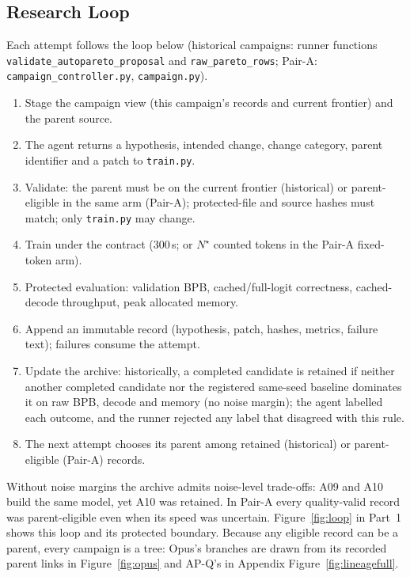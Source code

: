 \documentclass{article}
\newif\ifshowhumanmarkers \showhumanmarkersfalse
\newcommand{\humantag}[1]{{\color{humanframe}\sffamily\scriptsize\bfseries HUMAN AUTHOR MUST REWRITE/VERIFY [#1]}\ }
\newcommand{\humanauthor}[2][]{\ifshowhumanmarkers\begin{humanbox}\humantag{#1}#2\end{humanbox}\else #2\par\fi}
\begin{document}
\subsection{Research Loop}\label{sec:loop}
Each attempt follows the loop below (historical campaigns: runner functions \texttt{validate\_autopareto\_proposal} and \texttt{raw\_pareto\_rows}; Pair-A: \texttt{campaign\_controller.py}, \texttt{campaign.py}).
{\small\begin{enumerate}\setlength{\itemsep}{0pt}\setlength{\parskip}{0pt}
\item Stage the campaign view (this campaign's records and current frontier) and the parent source.
\item The agent returns a hypothesis, intended change, change category, parent identifier and a patch to \texttt{train.py}.
\item Validate: the parent must be on the current frontier (historical) or parent-eligible in the same arm (Pair-A); protected-file and source hashes must match; only \texttt{train.py} may change.
\item Train under the contract (300\,s; or $N^\star$ counted tokens in the Pair-A fixed-token arm).
\item Protected evaluation: validation BPB, cached/full-logit correctness, cached-decode throughput, peak allocated memory.
\item Append an immutable record (hypothesis, patch, hashes, metrics, failure text); failures consume the attempt.
\item Update the archive: historically, a completed candidate is retained if neither another completed candidate nor the registered same-seed baseline dominates it on raw BPB, decode and memory (no noise margin); the agent labelled each outcome, and the runner rejected any label that disagreed with this rule.
\item The next attempt chooses its parent among retained (historical) or parent-eligible (Pair-A) records.
\end{enumerate}}
Without noise margins the archive admits noise-level trade-offs: A09 and A10 build the same model, yet A10 was retained. In Pair-A every quality-valid record was parent-eligible even when its speed was uncertain.
\humanauthor[P2-05b]{Figure~\ref{fig:loop} in Part~1 shows this loop and its protected boundary. Because any eligible record can be a parent, every campaign is a tree: Opus's branches are drawn from its recorded parent links in Figure~\ref{fig:opus} and AP-Q's in Appendix Figure~\ref{fig:lineagefull}.}
\end{document}
